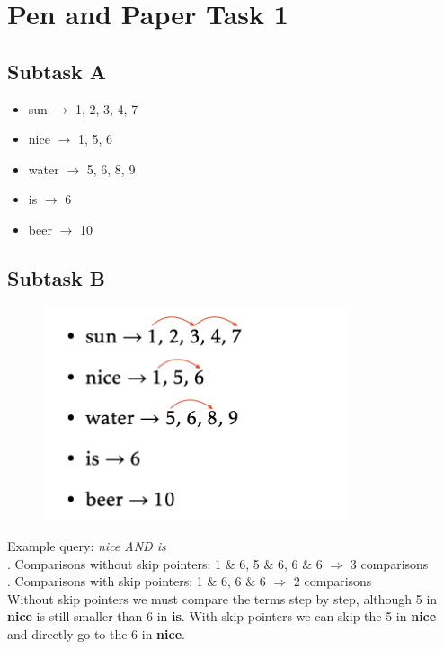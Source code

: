 \documentclass[a4paper]{scrartcl}
\begin{document}
    
\section*{Pen and Paper Task 1}
    
\subsection*{Subtask A}

\begin{itemize}
    \item sun $\rightarrow$ 1, 2, 3, 4, 7
    \item nice $\rightarrow$ 1, 5, 6
    \item water $\rightarrow$ 5, 6, 8, 9
    \item is $\rightarrow$ 6
    \item beer $\rightarrow$ 10
\end{itemize}

\subsection*{Subtask B}
\begin{figure}[ht]
  \begin{center}
    \includegraphics[width=0.8\textwidth]{img/skip_pointers.png}
  \end{center}
\end{figure}
Example query: \textit{nice AND is}\\
. Comparisons without skip pointers: 1 \& 6, 5 \& 6, 6 \& 6 $\Rightarrow$ 3 comparisons\\
. Comparisons with skip pointers: 1 \& 6, 6 \& 6 $\Rightarrow$ 2 comparisons\\
\indent Without skip pointers we must compare the terms step by step, although 5 in \textbf{nice} is still smaller than 6 in \textbf{is}. With skip pointers we can skip the 5 in \textbf{nice} and directly go to the 6 in \textbf{nice}.\\
\end{document}
